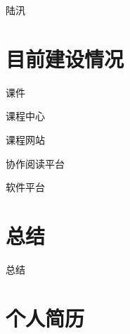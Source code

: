 \documentclass{beamer}
\numberwithin{subsection}{section}
\begin{document}
\begin{frame}{陆汛}
\end{frame}
\section{目前建设情况}
\begin{frame}{课件}
\end{frame}

\begin{frame}{课程中心}
\end{frame}

\begin{frame}{课程网站}
\end{frame}

\begin{frame}{协作阅读平台}
\end{frame}

\begin{frame}{软件平台}
\end{frame}

\section{总结}
\begin{frame}{总结}
\end{frame}
\section{个人简历}
\end{document}
